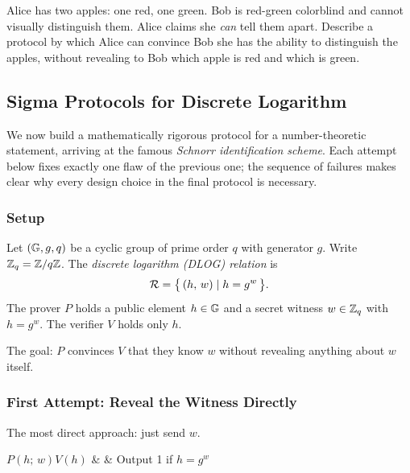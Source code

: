 \begin{exercisebox}
  Alice has two apples: one red, one green. Bob is red-green colorblind and cannot visually distinguish them. Alice claims she \emph{can} tell them apart. Describe a protocol by which Alice can convince Bob she has the ability to distinguish the apples, without revealing to Bob which apple is red and which is green.
\end{exercisebox}

\subsection{Sigma Protocols for Discrete Logarithm}

We now build a mathematically rigorous protocol for a number-theoretic statement, arriving at the famous \emph{Schnorr identification scheme}. Each attempt below fixes exactly one flaw of the previous one; the sequence of failures makes clear why every design choice in the final protocol is necessary.

\subsubsection{Setup}

Let $(\mathbb{G}, g, q)$ be a cyclic group of prime order $q$ with generator $g$. Write $\mathbb{Z}_q = \mathbb{Z}/q\mathbb{Z}$. The \emph{discrete logarithm (DLOG) relation} is
\[
  \mathcal{R} = \bigl\{\,(h,\,w) \mid h = g^w\,\bigr\}.
\]
The prover $P$ holds a public element $h \in \mathbb{G}$ and a secret witness $w \in \mathbb{Z}_q$ with $h = g^w$. The verifier $V$ holds only $h$.

The goal: $P$ convinces $V$ that they know $w$ without revealing anything about $w$ itself.

\subsubsection{First Attempt: Reveal the Witness Directly}

The most direct approach: just send $w$.

\medskip
\noindent
\begin{minipage}[t]{0.60\linewidth}
\begin{protocolbox}
\begin{sigmatab}{$P(h;\, w)$}{$V(h)$}
  &  & Output 1 if $h = g^w$ \\
\end{sigmatab}
\end{protocolbox}
\end{minipage}\hfill
\begin{minipage}[t]{0.36\linewidth}
\vspace{0.5em}
\propbox{\propyes}{\propno}{\propyes}
\end{minipage}

